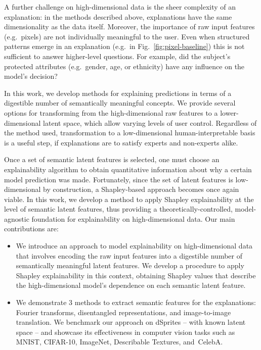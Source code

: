 \documentclass{article}
\DeclareRobustCommand{\Fig}[1]{Fig.~\ref{fig:#1}}
\begin{document}
A further challenge on high-dimensional data is the sheer complexity of an explanation: in the methods described above, explanations have the same dimensionality as the data itself. Moreover, the importance of raw input features (e.g.~pixels) are not individually meaningful to the user. Even when structured patterns emerge in an explanation (e.g.~in \Fig{pixel-baseline}) this is not sufficient to answer higher-level questions. For example, did the subject's protected attributes (e.g.~gender, age, or ethnicity) have any influence on the model's decision?
    
In this work, we develop methods for explaining predictions in terms of a digestible number of semantically meaningful concepts. We provide several options for transforming from the high-dimensional raw features to a lower-dimensional latent space, which allow varying levels of user control. Regardless of the method used, transformation to a low-dimensional human-interpretable basis is a useful step, if explanations are to satisfy experts and non-experts alike.
    
Once a set of semantic latent features is selected, one must choose an explainability algorithm to obtain quantitative information about why a certain model prediction was made. Fortunately, since the set of latent features is low-dimensional by construction, a Shapley-based approach becomes once again viable. In this work, we develop a method to apply Shapley explainability at the level of semantic latent features, thus providing a theoretically-controlled, model-agnostic foundation for explainability on high-dimensional data.
Our main contributions are:
\begin{itemize}[leftmargin=15pt]
    \item We introduce an approach to model explainability on high-dimensional data that involves encoding the raw input features into a digestible number of semantically meaningful latent features. We develop a procedure to apply Shapley explainability in this context, obtaining Shapley values that describe the high-dimensional model's dependence on each semantic latent feature. 
    \item We demonstrate 3 methods to extract semantic features for the explanations: Fourier transforms, disentangled representations, and image-to-image translation. We benchmark our approach on dSprites -- with known latent space -- and showcase its effectiveness in computer vision tasks such as MNIST, CIFAR-10, ImageNet, Describable Textures, \mbox{and CelebA.}
\end{itemize}
\end{document}
